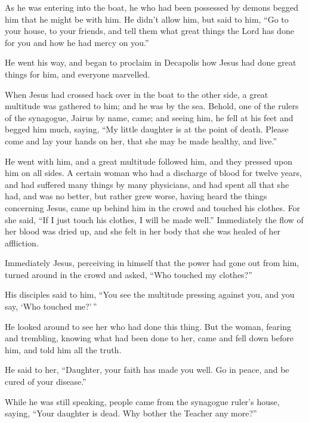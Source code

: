  As he was entering into the boat, he who had been
possessed by demons begged him that he might be with him.
 He didn't allow him, but said to him, ``Go to your
house, to your friends, and tell them what great things the Lord has
done for you and how he had mercy on you.''

 He went his way, and began to proclaim in Decapolis how
Jesus had done great things for him, and everyone marvelled.

 When Jesus had crossed back over in the boat to the
other side, a great multitude was gathered to him; and he was by the
sea.  Behold, one of the rulers of the synagogue, Jairus
by name, came; and seeing him, he fell at his feet  and
begged him much, saying, ``My little daughter is at the point of death.
Please come and lay your hands on her, that she may be made healthy, and
live.''

 He went with him, and a great multitude followed him,
and they pressed upon him on all sides.  A certain woman
who had a discharge of blood for twelve years,  and had
suffered many things by many physicians, and had spent all that she had,
and was no better, but rather grew worse,  having heard
the things concerning Jesus, came up behind him in the crowd and touched
his clothes.  For she said, ``If I just touch his
clothes, I will be made well.''  Immediately the flow of
her blood was dried up, and she felt in her body that she was healed of
her affliction.

 Immediately Jesus, perceiving in himself that the power
had gone out from him, turned around in the crowd and asked, ``Who
touched my clothes?''

 His disciples said to him, ``You see the multitude
pressing against you, and you say, `Who touched me?'\,''

 He looked around to see her who had done this thing.
 But the woman, fearing and trembling, knowing what had
been done to her, came and fell down before him, and told him all the
truth.

 He said to her, ``Daughter, your faith has made you
well. Go in peace, and be cured of your disease.''

 While he was still speaking, people came from the
synagogue ruler's house, saying, ``Your daughter is dead. Why bother the
Teacher any more?''

